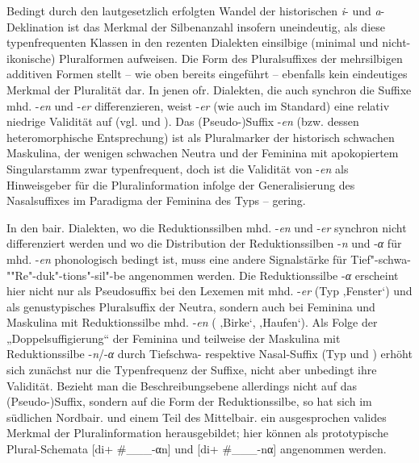 Bedingt durch den lautgesetzlich erfolgten Wandel der historischen \textit{i}{}- und \textit{a}{}-Deklination ist das Merkmal der Silbenanzahl insofern uneindeutig, als diese typenfrequenten Klassen in den rezenten Dialekten einsilbige (minimal und nicht-ikonische) Pluralformen aufweisen. Die Form des Pluralsuffixes der mehrsilbigen additiven Formen stellt -- wie oben bereits eingeführt -- ebenfalls kein eindeutiges Merkmal der Pluralität dar. In jenen ofr. Dialekten, die auch synchron die Suffixe mhd. -\textit{en} und -\textit{er} differenzieren, weist -\textit{er} (wie auch im Standard) eine relativ niedrige Validität auf (vgl. \citealt[84]{Köpcke1993} und ). Das (Pseu\-do-)Suffix -\textit{en} (bzw. dessen heteromorphische Entsprechung) ist als Pluralmarker der historisch schwachen Maskulina, der wenigen schwachen Neutra und der Feminina mit apokopiertem Singularstamm zwar typenfrequent, doch ist die Validität von -\textit{en} als Hinweisgeber für die Pluralinformation infolge der Generalisierung des Nasalsuffixes im Paradigma der Feminina des Typs  --  gering.

In den bair. Dialekten, wo die Reduktionssilben mhd. -\textit{en} und -\textit{er} synchron nicht differenziert werden und wo die Distribution der Reduktionssilben -\textit{n} und \mbox{-\textit{α}} für mhd. -\textit{en} phonologisch bedingt ist, muss eine andere Signalstärke für Tief"-schwa-""Re"-duk"-tions"-sil"-be angenommen werden. Die Reduktionssilbe -\textit{α} erscheint hier nicht nur als Pseudosuffix bei den Lexemen mit mhd. -\textit{er} (Typ  ‚Fenster‘) und als genustypisches Pluralsuffix der Neutra, sondern auch bei Feminina und Maskulina mit Reduktionssilbe mhd. -\textit{en} ( ‚Birke‘,  ‚Haufen‘). Als Folge der „Doppelsuffigierung“ der Feminina und teilweise der Maskulina mit Reduktionssilbe -\textit{n}/-\textit{α} durch Tiefschwa- respektive Nasal-Suffix (Typ  und ) erhöht sich zunächst nur die Typenfrequenz der Suffixe, nicht aber unbedingt ihre Validität. Bezieht man die Beschreibungsebene allerdings nicht auf das (Pseudo-)Suffix, sondern auf die Form der Reduktionssilbe, so hat sich im südlichen Nordbair. und einem Teil des Mittelbair. ein ausgesprochen valides Merkmal der Pluralinformation herausgebildet; hier können als prototypische Plural-Schemata
[di+ \#\_\_\_-αn] und [di+ \#\_\_\_-nα] angenommen werden.

